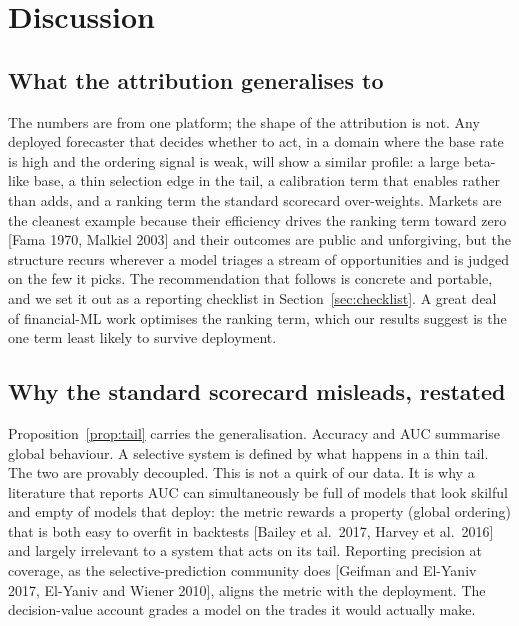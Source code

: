 \documentclass[10pt, a4paper, oneside]{article}
\theoremstyle{definition}
\theoremstyle{plain}
\begin{document}
\section{Discussion}
\label{sec:discussion}
\subsection{What the attribution generalises to}
The numbers are from one platform; the shape of the attribution is not. Any deployed
forecaster that decides whether to act, in a domain where the base rate is high and
the ordering signal is weak, will show a similar profile: a large beta-like base, a
thin selection edge in the tail, a calibration term that enables rather than adds, and
a ranking term the standard scorecard over-weights. Markets are the cleanest example
because their efficiency drives the ranking term toward zero [Fama 1970,
Malkiel 2003] and their outcomes are public and unforgiving, but the structure recurs
wherever a model triages a stream of opportunities and is judged on the few it picks.
The recommendation that follows is concrete and portable, and we set it out as a
reporting checklist in Section~\ref{sec:checklist}. A great deal of financial-ML work
optimises the ranking term, which our results suggest is the one term least likely to
survive deployment.

\subsection{Why the standard scorecard misleads, restated}
Proposition~\ref{prop:tail} carries the generalisation. Accuracy and AUC summarise
global behaviour. A selective system is defined by what happens in a thin tail. The two
are provably decoupled. This is not a quirk of our data. It is why a
literature that reports AUC can simultaneously be full of models that look skilful and
empty of models that deploy: the metric rewards a property (global ordering) that is
both easy to overfit in backtests [Bailey et al.\ 2017, Harvey et al.\ 2016] and
largely irrelevant to a system that acts on its tail. Reporting precision at coverage,
as the selective-prediction community does [Geifman and El-Yaniv 2017,
El-Yaniv and Wiener 2010], aligns the metric with the deployment. The decision-value
account grades a model on the trades it would actually make.
\end{document}
